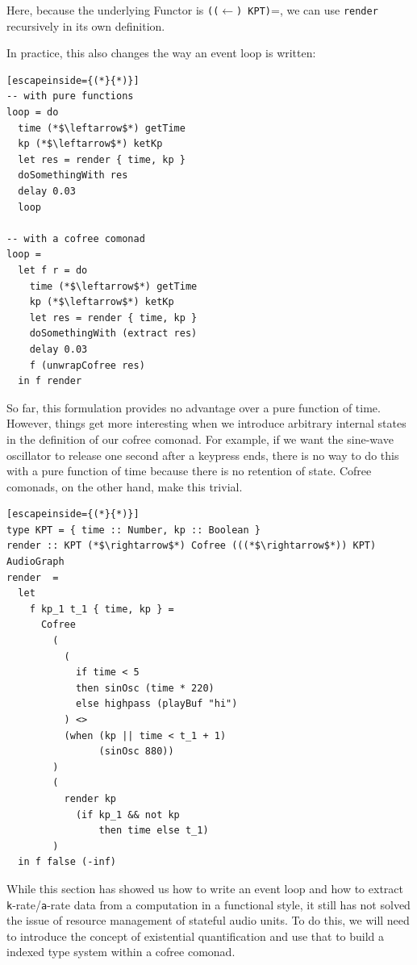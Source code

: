 \documentclass{article}
\begin{document}
Here, because the underlying Functor is \texttt{(($\leftarrow$) KPT)}=, we can use \texttt{render} recursively in its own definition.

In practice, this also changes the way an event loop is written:

\lstset{language=Haskell, style=psstyle}
\begin{lstlisting}[escapeinside={(*}{*)}]
-- with pure functions
loop = do
  time (*$\leftarrow$*) getTime
  kp (*$\leftarrow$*) ketKp
  let res = render { time, kp }
  doSomethingWith res
  delay 0.03
  loop

-- with a cofree comonad
loop =
  let f r = do
    time (*$\leftarrow$*) getTime
    kp (*$\leftarrow$*) ketKp
    let res = render { time, kp }
    doSomethingWith (extract res)
    delay 0.03
    f (unwrapCofree res)
  in f render
\end{lstlisting}

So far, this formulation provides no advantage over a pure function of time. However, things get more interesting when we introduce arbitrary internal states in the definition of our cofree comonad. For example, if we want the sine-wave oscillator to release one second after a keypress ends, there is no way to do this with a pure function of time because there is no retention of state. Cofree comonads, on the other hand, make this trivial.

\lstset{language=Haskell, style=psstyle}
\begin{lstlisting}[escapeinside={(*}{*)}]
type KPT = { time :: Number, kp :: Boolean }
render :: KPT (*$\rightarrow$*) Cofree (((*$\rightarrow$*)) KPT) AudioGraph
render  =
  let
    f kp_1 t_1 { time, kp } =
      Cofree
        (
          (
            if time < 5
            then sinOsc (time * 220)
            else highpass (playBuf "hi")
          ) <>
          (when (kp || time < t_1 + 1)
                (sinOsc 880))
        )
        (
          render kp
            (if kp_1 && not kp
                then time else t_1)
        )
  in f false (-inf)
\end{lstlisting}

While this section has showed us how to write an event loop and how to extract \texttt{k}-rate/\texttt{a}-rate data from a computation in a functional style, it still has not solved the issue of resource management of stateful audio units. To do this, we will need to introduce the concept of existential quantification and use that to build a indexed type system within a cofree comonad.
\end{document}
